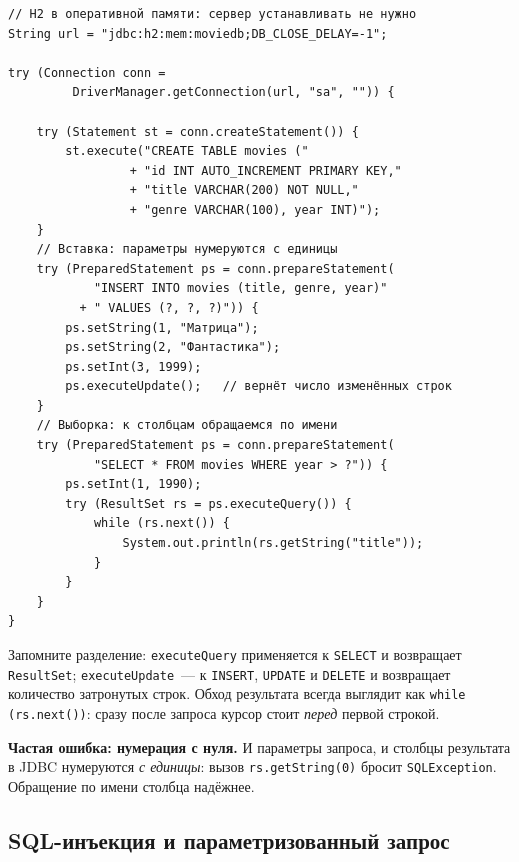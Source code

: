 \begin{listing}[H]
\begin{verbatim}
// H2 в оперативной памяти: сервер устанавливать не нужно
String url = "jdbc:h2:mem:moviedb;DB_CLOSE_DELAY=-1";

try (Connection conn =
         DriverManager.getConnection(url, "sa", "")) {

    try (Statement st = conn.createStatement()) {
        st.execute("CREATE TABLE movies ("
                 + "id INT AUTO_INCREMENT PRIMARY KEY,"
                 + "title VARCHAR(200) NOT NULL,"
                 + "genre VARCHAR(100), year INT)");
    }
    // Вставка: параметры нумеруются с единицы
    try (PreparedStatement ps = conn.prepareStatement(
            "INSERT INTO movies (title, genre, year)"
          + " VALUES (?, ?, ?)")) {
        ps.setString(1, "Матрица");
        ps.setString(2, "Фантастика");
        ps.setInt(3, 1999);
        ps.executeUpdate();   // вернёт число изменённых строк
    }
    // Выборка: к столбцам обращаемся по имени
    try (PreparedStatement ps = conn.prepareStatement(
            "SELECT * FROM movies WHERE year > ?")) {
        ps.setInt(1, 1990);
        try (ResultSet rs = ps.executeQuery()) {
            while (rs.next()) {
                System.out.println(rs.getString("title"));
            }
        }
    }
}
\end{verbatim}
\caption{Создание таблицы и операции CRUD через JDBC}
\label{lst:06-4}
\end{listing}

Запомните разделение: \texttt{executeQuery} применяется к \texttt{SELECT} и
возвращает \texttt{ResultSet}; \texttt{executeUpdate}~--- к \texttt{INSERT},
\texttt{UPDATE} и \texttt{DELETE} и возвращает количество затронутых строк.
Обход результата всегда выглядит как \texttt{while (rs.next())}: сразу после
запроса курсор стоит \emph{перед} первой строкой.

\begin{oshibka}
\textbf{Частая ошибка: нумерация с нуля.} И параметры запроса, и столбцы
результата в JDBC нумеруются \emph{с единицы}: вызов \texttt{rs.getString(0)}
бросит \texttt{SQLException}. Обращение по имени столбца надёжнее.
\end{oshibka}

\subsection{SQL-инъекция и параметризованный запрос}

